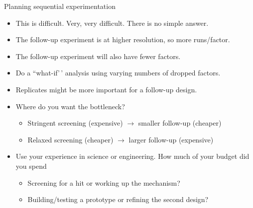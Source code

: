 \documentclass[
  10pt,
  ignorenonframetext,
]{beamer}
\providecommand{\tightlist}{%
  \setlength{\itemsep}{0pt}\setlength{\parskip}{0pt}}
\begin{document}
\begin{frame}{Planning sequential experimentation}
\protect\hypertarget{planning-sequential-experimentation}{}
\begin{itemize}
\tightlist
\item
  This is difficult. Very, very difficult. There is no simple answer.
\end{itemize}

\pause

\begin{itemize}
\tightlist
\item
  The follow-up experiment is at higher resolution, so more runs/factor.
\item
  The follow-up experiment will also have fewer factors.
\end{itemize}

\pause

\begin{itemize}
\tightlist
\item
  Do a ``what-if'\,' analysis using varying numbers of dropped factors.
\item
  Replicates might be more important for a follow-up design.
\end{itemize}

\pause

\begin{itemize}
\tightlist
\item
  Where do you want the bottleneck?

  \begin{itemize}
  \tightlist
  \item
    Stringent screening (expensive) \(\rightarrow\) smaller follow-up
    (cheaper)
  \item
    Relaxed screening (cheaper) \(\rightarrow\) larger follow-up
    (expensive)
  \end{itemize}
\end{itemize}

\pause

\begin{itemize}
\tightlist
\item
  Use your experience in science or engineering. How much of your budget
  did you spend

  \begin{itemize}
  \tightlist
  \item
    Screening for a hit or working up the mechanism?
  \item
    Building/testing a prototype or refining the second design?
  \end{itemize}
\end{itemize}
\end{frame}
\end{document}
